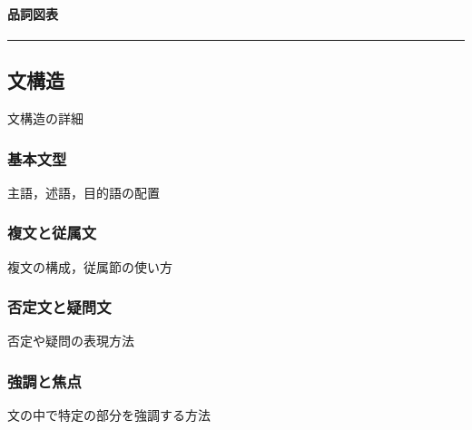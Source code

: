 \documentclass[
  japanese,
]{article}
\providecommand{\tightlist}{%
  \setlength{\itemsep}{0pt}\setlength{\parskip}{0pt}}
\begin{document}
\paragraph{品詞図表}\label{subsection5.6.2}

\begin{center}\rule{0.5\linewidth}{0.5pt}\end{center}

\subsection{文構造}\label{chapter6}

文構造の詳細

\subsubsection{基本文型}\label{section6.1}

主語，述語，目的語の配置

\begin{description}
\tightlist
\item[]
\end{description}

\subsubsection{複文と従属文}\label{section6.2}

複文の構成，従属節の使い方

\begin{description}
\tightlist
\item[]
\end{description}

\subsubsection{否定文と疑問文}\label{section6.3}

否定や疑問の表現方法

\begin{description}
\tightlist
\item[]
\end{description}

\subsubsection{強調と焦点}\label{section6.4}

文の中で特定の部分を強調する方法
\end{document}

